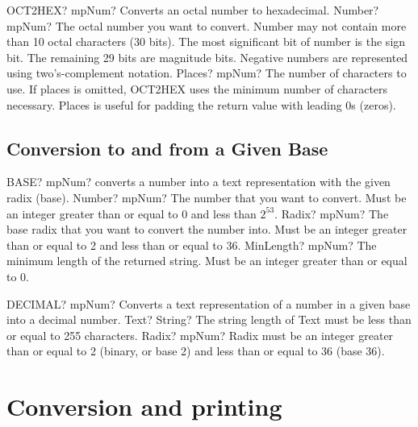 \vspace{0.6cm}
\begin{mpFunctionsExtract}
	\mpWorksheetFunctionTwoNotImplemented
	{OCT2HEX? mpNum? Converts an octal number to hexadecimal.}
	{Number? mpNum? The octal number you want to convert. Number may not contain more than 10 octal characters (30 bits). The most significant bit of number is the sign bit. The remaining 29 bits are magnitude bits. Negative numbers are represented using two's-complement notation.}
	{Places? mpNum? The number of characters to use. If places is omitted, OCT2HEX uses the minimum number of characters necessary. Places is useful for padding the return value with leading 0s (zeros).}
\end{mpFunctionsExtract}



\subsection{Conversion to and from a Given Base}


\begin{mpFunctionsExtract}
	\mpWorksheetFunctionThree
	{BASE? mpNum? converts a number into a text representation with the given radix (base).}
	{Number? mpNum? The number that you want to convert. Must be an integer greater than or equal to 0 and less than $2^53$.}
	{Radix? mpNum? The base radix that you want to convert the number into. Must be an integer greater than or equal to 2 and less than or equal to 36.}
	{MinLength? mpNum? The minimum length of the returned string. Must be an integer greater than or equal to 0.}
\end{mpFunctionsExtract}


\vspace{0.6cm}
\begin{mpFunctionsExtract}
	\mpWorksheetFunctionTwoNotImplemented
	{DECIMAL? mpNum? Converts a text representation of a number in a given base into a decimal number.}
	{Text? String? The string length of Text must be less than or equal to 255 characters.}
	{Radix? mpNum? Radix must be an integer greater than or equal to 2 (binary, or base 2) and less than or equal to 36 (base 36).}
\end{mpFunctionsExtract}






\newpage
\section{Conversion and printing}


